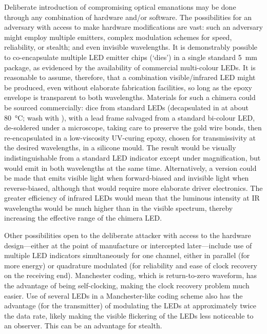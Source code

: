 \documentclass[a4paper,twoside,11pt,openany]{book}
\begin{document}
Deliberate introduction of compromising optical emanations may be done through
any combination of hardware and/or software. The possibilities for an adversary
with access to make hardware modifications are vast: such an adversary might
employ multiple emitters, complex modulation schemes for speed, reliability, or
stealth; and even invisible wavelengths. It is demonstrably possible to
co-encapsulate multiple LED emitter chips (`dies') in a single standard
\SI{5}{\milli\metre} package, as evidenced by the availability of commercial
multi-colour LEDs. It is reasonable to assume, therefore, that a combination
visible/infrared LED might be produced, even without elaborate fabrication
facilities, so long as the epoxy envelope is transparent to both wavelengths.
Materials for such a chimera could be sourced commercially: dice from standard
LEDs (decapsulated in  at about \SI{80}{\celsius}; wash with
), with a lead frame salvaged from a standard bi-colour LED,
de-soldered under a microscope, taking care to preserve the gold wire bonds,
then re-encapsulated in a low-viscosity UV-curing epoxy, chosen for
transmissivity at the desired wavelengths, in a silicone mould. The result
would be visually indistinguishable from a standard LED indicator except under
magnification, but would emit in both wavelengths at the same time.
Alternatively, a version could be made that emits visible light when
forward-biased and invisible light when reverse-biased, although that would
require more elaborate driver electronics. The greater efficiency of infrared
LEDs would mean that the luminous intensity at IR wavelengths would be much
higher than in the visible spectrum, thereby increasing the effective range of
the chimera LED.

Other possibilities open to the deliberate attacker with access to the hardware
design---either at the point of manufacture or intercepted later---include use
of multiple LED indicators simultaneously for one channel, either in parallel
(for more energy) or quadrature modulated (for reliability and ease of clock
recovery on the receiving end). Manchester coding, which is return-to-zero
waveform, has the advantage of being self-clocking, making the clock recovery
problem much easier. Use of several LEDs in a Manchester-like coding scheme
also has the advantage (for the transmitter) of modulating the LEDs at
approximately twice the data rate, likely making the visible flickering of the
LEDs less noticeable to an observer. This can be an advantage for stealth.
\end{document}
